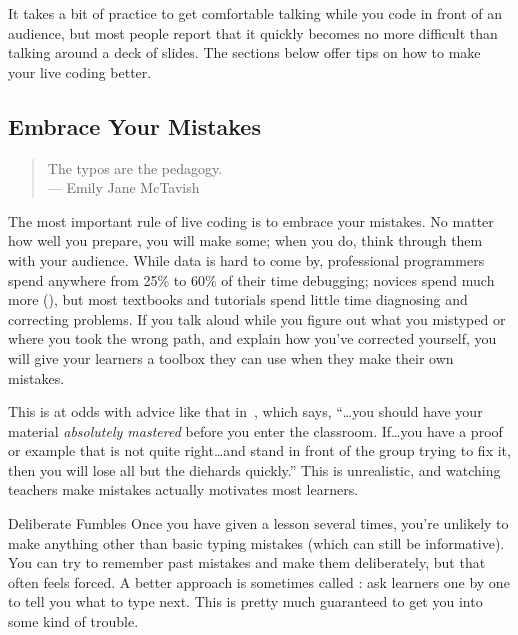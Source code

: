 It takes a bit of practice to get comfortable
talking while you code in front of an audience,
but most people report that it quickly becomes no more difficult than talking around a deck of slides.
The sections below offer tips on how to make your live coding better.

\subsection*{Embrace Your Mistakes}

\begin{quote}

  The typos are the pedagogy. \\
  --- Emily Jane McTavish

\end{quote}

The most important rule of live coding is to embrace your mistakes.
No matter how well you prepare,
you will make some;
when you do,
think through them with your audience.
While data is hard to come by,
professional programmers spend anywhere from 25\% to 60\% of their time debugging;
novices spend much more (),
but most textbooks and tutorials spend little time diagnosing and correcting problems.
If you talk aloud while you figure out what you mistyped
or where you took the wrong path,
and explain how you've corrected yourself,
you will give your learners a toolbox they can use when they make their own mistakes.

This is at odds with advice like that in~\cite{Kran2015},
which says,
``{\ldots}you should have your material \emph{absolutely mastered} before you enter the classroom.
If{\ldots}you have a proof or example that is not quite right{\ldots}and stand in front of the group trying to fix it,
then you will lose all but the diehards quickly.''
This is unrealistic,
and watching teachers make mistakes actually motivates most learners.

\begin{aside}{Deliberate Fumbles}
  Once you have given a lesson several times,
  you're unlikely to make anything other than basic typing mistakes
  (which can still be informative).
  You can try to remember past mistakes and make them deliberately,
  but that often feels forced.
  A better approach is sometimes called :
  ask learners one by one to tell you what to type next.
  This is pretty much guaranteed to get you into some kind of trouble.
\end{aside}

